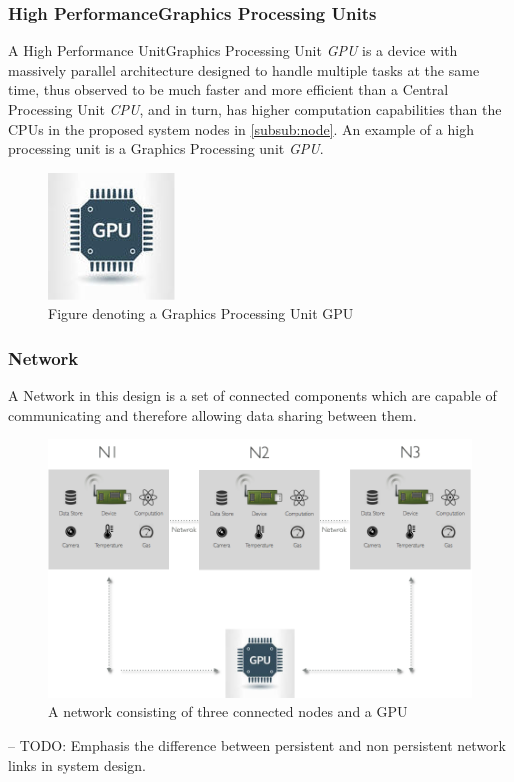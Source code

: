 \subsubsection{High PerformanceGraphics Processing Units }

A High Performance UnitGraphics Processing Unit \textit{GPU} is a device with massively parallel architecture designed to handle multiple tasks at the same time, thus observed to be much faster and more efficient than a Central Processing Unit \textit{CPU}, and in turn, has higher computation capabilities than the CPUs in the proposed system nodes in \ref{subsub:node}. An example of a high processing unit is  a Graphics Processing unit \textit{GPU}.

\begin{figure}[H]
	\centering
	\includegraphics[scale=0.7]{images/gpu.png}
		\caption{Figure denoting a Graphics Processing Unit GPU}
	\label{fig:gpu}
\end{figure}

\subsubsection{Network}
\label{subsub:network}
A Network in this design is a set of connected components which are capable of communicating and therefore allowing data sharing between them.
\begin{figure}[H]
	\centering
	\includegraphics[scale=0.4]{images/network.png}
	\caption{A network consisting of three connected nodes and a GPU}
	\label{fig:network}
\end{figure}
-- TODO: 
Emphasis the difference between persistent and non persistent network links in system design.

